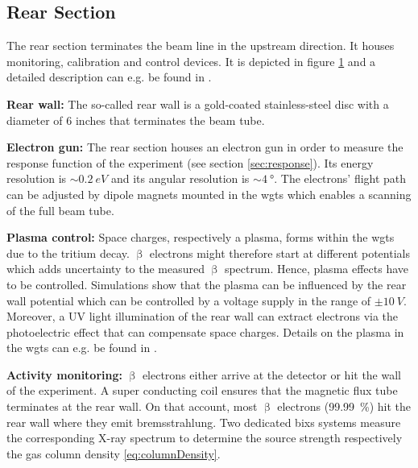     \subsection{Rear Section}
    \label{sec:rearSection}
    \begin{figure}[t]
	    \label{fig:rearSection}
    \end{figure}
    
    The rear section terminates the beam line in the upstream direction. It houses monitoring, calibration and control devices. It is depicted in figure \ref{fig:rearSection} and a detailed description can e.g. be found in \cite{Babutzka2014}.
    
    {\par \textbf{Rear wall:} The so-called rear wall is a gold-coated stainless-steel disc with a diameter of 6 inches that terminates the beam tube.}
    
    {\par\textbf{Electron gun:}
    The rear section houses an electron gun in order to measure the response function of the experiment (see section \ref{sec:response}). Its energy resolution is $\sim \SI{0.2}{eV}$ and its angular resolution is $\sim \SI{4}{\degree}$. The electrons' flight path can be adjusted by dipole magnets mounted in the \gls{wgts} which enables a scanning of the full beam tube.}
    
    {\par\textbf{Plasma control:}
    Space charges, respectively a plasma, forms within the \gls{wgts} due to the tritium decay. $\upbeta$ electrons might therefore start at different potentials which adds uncertainty to the measured $\upbeta$ spectrum. Hence, plasma effects have to be controlled. Simulations show that the plasma can be influenced by the rear wall potential which can be controlled by a voltage supply in the range of $\pm \SI{10}{V}$. Moreover, a UV light illumination of the rear wall can extract electrons via the photoelectric effect that can compensate space charges. Details on the plasma in the \gls{wgts} can e.g. be found in \cite{Kuckert2018}.}
    
    {\par\textbf{Activity monitoring:}
    $\upbeta$ electrons either arrive at the detector or hit the wall of the experiment. A super conducting coil ensures that the magnetic flux tube terminates at the rear wall. On that account, most $\upbeta$ electrons (\SI{99.99}{\percent}) hit the rear wall where they emit bremsstrahlung. Two dedicated \gls{bixs} systems measure the corresponding X-ray spectrum to determine the source strength respectively the gas column density \eqref{eq:columnDensity}.}
    
